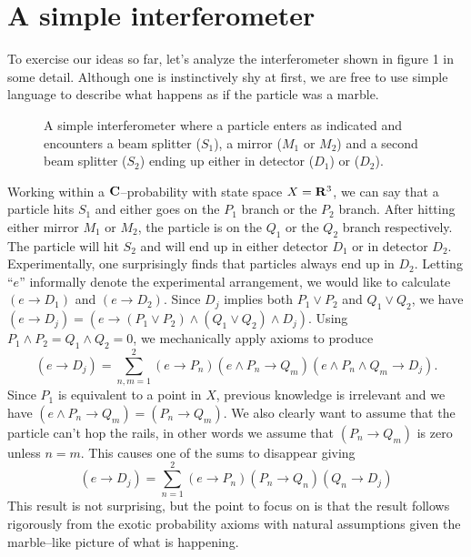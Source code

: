 \documentclass[12pt]{article}
\begin{document}
\section{A simple interferometer}

    To exercise our ideas so far, let's 
analyze the interferometer shown in figure 1 in some detail. Although one is 
instinctively shy at first, we are free to use simple language
to describe what happens as if the particle was a marble.

\begin{figure}[htbp]
\begin{center}
  \leavevmode
  \caption{ A simple interferometer where a particle enters as indicated and encounters
  a beam splitter ($S_1$), a mirror ($M_1$ or $M_2$) and a second beam splitter ($S_2$) ending up either
  in detector ($D_1$) or ($D_2$).}
  \label{fig:testfig1}
\end{center}
\end{figure}


\noindent Working within a ${\bf C}$--probability with state space $X={\bf R}^3$,
we can say that a particle 
hits $S_1$ and either goes on the $P_1$ branch
or the $P_2$ branch.  After hitting either mirror $M_1$ or $M_2$, the
particle is on the $Q_1$ or the $Q_2$ branch respectively.  The particle
will hit $S_2$ and will end up in either detector $D_1$ or in detector 
$D_2$.  Experimentally, one surprisingly finds that particles always 
end up in $D_2$.  Letting ``$e$'' informally denote the experimental 
arrangement, we would like to calculate $(e\rightarrow D_1)$ and $(e\rightarrow D_2)$.
Since $D_j$ implies both $P_1\vee P_2$ and $Q_1\vee Q_2$, we have
$(e\rightarrow D_j)=(e\rightarrow(P_1\vee P_2)\wedge(Q_1\vee Q_2)\wedge D_j)$.
Using $P_1\wedge P_2 = Q_1\wedge Q_2 = 0$, we mechanically apply axioms to 
produce
\begin{equation}
(e\rightarrow D_j) = \sum_{n,m=1}^2 (e\rightarrow P_n)(e\wedge P_n\rightarrow Q_m)(e\wedge P_n\wedge Q_m\rightarrow D_j).
\end{equation}
Since $P_1$ is equivalent to a point in $X$, previous knowledge is irrelevant and 
we have $(e\wedge P_n\rightarrow Q_m)=(P_n\rightarrow Q_m)$.  
We also clearly want to assume that the particle can't hop the rails, in other
words we assume that $(P_n\rightarrow Q_m)$ is zero unless $n=m$.
This causes one of the sums to disappear giving
\begin{equation}
(e\rightarrow D_j) = \sum_{n=1}^2 (e\rightarrow P_n)(P_n\rightarrow Q_n)(Q_n\rightarrow D_j)
\end{equation}
This result is not surprising, but the point to focus on is that the result
follows rigorously from the exotic probability axioms with natural assumptions
given the marble--like picture of what is happening.
\end{document}
